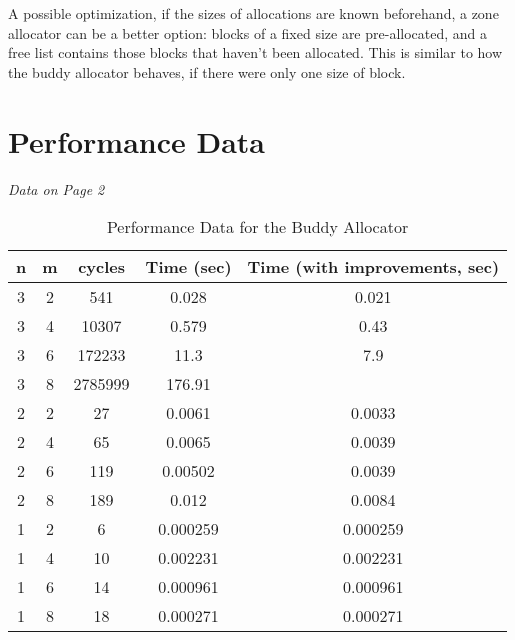 \documentclass[10pt]{article}
\begin{document}
A possible optimization, if the sizes of allocations are known beforehand, a zone allocator can be a better option: blocks of a fixed size are pre-allocated, and a free list contains those blocks that haven't been allocated. This is similar to how the buddy allocator behaves, if there were only one size of block.

\section{Performance Data}
{
\center\it
{Data on Page 2}
}

\pagebreak

\begin{table}[]
\begin{tabular}{c|c|c|c|c}
\textbf{n} & \textbf{m} & \textbf{cycles} & \textbf{Time (sec)} & \textbf{Time (with improvements, sec)} \\ \hline
3 & 2 & 541 & 0.028 & 0.021 \\
3 & 4 & 10307 & 0.579 & 0.43 \\
3 & 6 & 172233 & 11.3 & 7.9 \\
3 & 8 & 2785999 & 176.91 &  \\
2 & 2 & 27 & 0.0061 & 0.0033 \\
2 & 4 & 65 & 0.0065 & 0.0039 \\
2 & 6 & 119 & 0.00502 & 0.0039 \\
2 & 8 & 189 & 0.012 & 0.0084 \\
1 & 2 & 6 & 0.000259 & 0.000259 \\
1 & 4 & 10 & 0.002231 & 0.002231 \\
1 & 6 & 14 & 0.000961 & 0.000961 \\
1 & 8 & 18 & 0.000271 & 0.000271
\end{tabular}
\caption{Performance Data for the Buddy Allocator}
\end{table}
\end{document}
